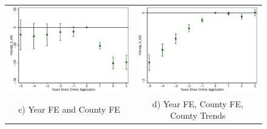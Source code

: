 \documentclass[11pt,letterpaper]{article}
\begin{document}
\begin{figure}
\begin{tabular}{cc}
\includegraphics[scale=0.57]{tabfig/evstu_snap_h_tot_one_yrcf_5_3}&\includegraphics[scale=0.57]{tabfig/evstu_snap_h_tot_one_yrcfsttr_5_3}\\
c) Year FE and County FE&d) Year FE, County FE, County Trends\\
\end{tabular}
\end{figure}
\end{document}
